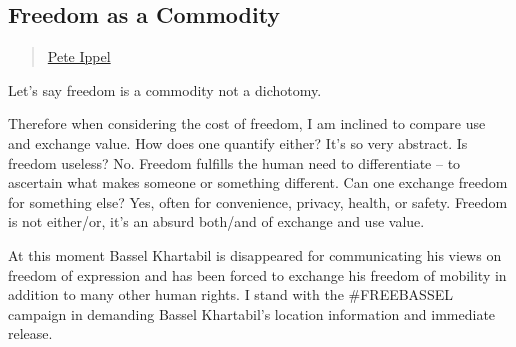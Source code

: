 \subsection{Freedom as a Commodity}\label{freedom-as-a-commodity}

\begin{quote}
\hyperlink{pete-ippel}{Pete Ippel}
\end{quote}

Let's say freedom is a commodity not a dichotomy.

Therefore when considering the cost of freedom, I am inclined to compare
use and exchange value. How does one quantify either? It's so very
abstract. Is freedom useless? No. Freedom fulfills the human need to
differentiate -- to ascertain what makes someone or something different.
Can one exchange freedom for something else? Yes, often for convenience,
privacy, health, or safety. Freedom is not either/or, it's an absurd
both/and of exchange and use value.

At this moment Bassel Khartabil is disappeared for communicating his
views on freedom of expression and has been forced to exchange his
freedom of mobility in addition to many other human rights. I stand with
the \#FREEBASSEL campaign in demanding Bassel Khartabil's location
information and immediate release.

